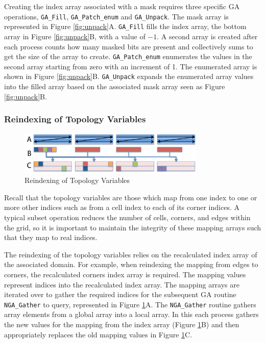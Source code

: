 Creating the index array associated with a mask requires three specific GA
operations, \verb=GA_Fill=, \verb=GA_Patch_enum= and \verb=GA_Unpack=.  The
mask array is represented in Figure \ref{fig:unpack}A.  \verb=GA_Fill= fills
the index array, the bottom array in Figure \ref{fig:unpack}B,  with a value
of $-1$.  A second array is created after each process counts how many masked
bits are present and collectively sums to get the size of the array to create.
\verb=GA_Patch_enum= enumerates the values in the second array starting from
zero with an increment of 1.  The enumerated array is shown in Figure
\ref{fig:unpack}B.  \verb=GA_Unpack= expands the enumerated array values into
the filled array based on the associated mask array seen as Figure
\ref{fig:unpack}B.

\subsubsection{Reindexing of Topology Variables}

\begin{figure}[!t]
\center
\includegraphics[width=3.5in]{images/reindex_label}
\caption{Reindexing of Topology Variables}
\label{fig:reindex}
\end{figure}

Recall that the topology variables are those which map from one index to
one or more other indices such as from a cell index to each of its corner
indices.  A typical subset operation reduces the number of cells, corners, and
edges within the grid, so it is important to maintain the integrity of these
mapping arrays such that they map to real indices.

The reindexing of the topology variables relies on the recalculated index
array of the associated domain.  For example, when reindexing the mapping from
edges to corners, the recalculated corners index array is required.  The
mapping values represent indices into the recalculated index array.  The
mapping arrays are iterated over to gather the required indices for the
subsequent GA routine \verb=NGA_Gather= to query, represented in Figure
\ref{fig:reindex}A.  The \verb=NGA_Gather= routine gathers array elements from
a global array into a local array.  In this each process gathers the new
values for the mapping from the index array (Figure \ref{fig:reindex}B) and
then appropriately replaces the old mapping values in Figure
\ref{fig:reindex}C.

